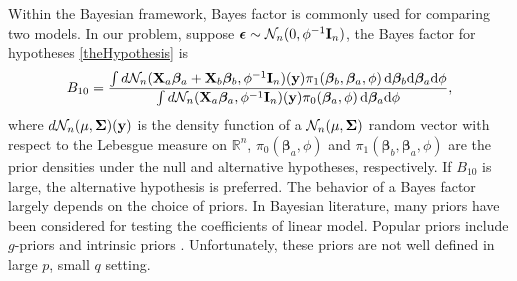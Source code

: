 \documentclass[11pt]{article}
\newcommand{\By}{\mathbf{y}}    \newcommand{\Bz}{\mathbf{z}}
\newcommand{\bfsym}[1]{\ensuremath{\boldsymbol{#1}}}
\def\bbeta{\bfsym \beta}
\theoremstyle{plain}
\theoremstyle{definition}
\theoremstyle{remark}
\begin{document}
Within the Bayesian framework, Bayes factor is commonly used for comparing two models.
In our problem, suppose $\bepsilon \sim \mathcal N_n (0,\phi^{-1} \BI_n)$, the Bayes factor for hypotheses \eqref{theHypothesis} is
\begin{equation*}
    B_{10}= \frac {
        \int d\mathcal N_n(\BX_a\bbeta_a + \BX_b\bbeta_b, \phi^{-1}\BI_n) (\By) \pi_1(\bbeta_b,\bbeta_a,\phi)\, \mathrm d\bbeta_b \mathrm d\bbeta_a \mathrm d\phi
}{
    \int d\mathcal N_n(\BX_a\bbeta_a, \phi^{-1} \BI_n)(\By) \pi_0(\bbeta_a,\phi) \, \mathrm d\bbeta_a \mathrm d\phi
    },
\end{equation*}
where $d\mathcal N_n(\mu, \bSigma)(\By)$ is the density function of a $\mathcal N_n(\mu,\bSigma) $ random vector with respect to the Lebesgue measure on $\mathbb R^n$,  $\pi_0(\bbeta_a,\phi)$ and $\pi_1(\bbeta_b,\bbeta_a,\phi)$ are the prior densities under the null and alternative hypotheses, respectively.
If $B_{10}$ is large, the alternative hypothesis is preferred.
The behavior of a Bayes factor largely depends on the choice of priors.
In Bayesian literature, many priors have been considered for testing the coefficients of linear model.
Popular priors include $g$-priors \citep{Liang2008Mixtures} and intrinsic priors \citep{Casella2006Obj}.
Unfortunately, these priors are not well defined in large $p$, small $q$ setting.
\end{document}

